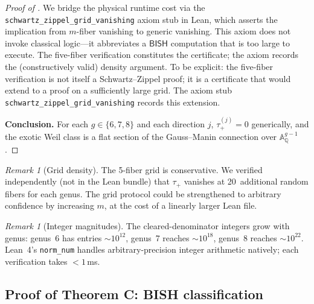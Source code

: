 \documentclass[11pt]{article}
\theoremstyle{plain}
\theoremstyle{definition}
\theoremstyle{remark}
\newtheorem{remark}[theorem]{Remark}
\newcommand{\QQ}{\mathbb{Q}}
\newcommand{\Aff}{\mathbb{A}}
\newcommand{\BISH}{\mathsf{BISH}}
\begin{document}
\begin{proof}[Proof of ]
We bridge the physical runtime cost via the
\texttt{schwartz\_zippel\_grid\_vanishing} axiom stub in Lean,
which asserts the implication from $m$-fiber vanishing to generic
vanishing.  This axiom does not invoke classical logic---it
abbreviates a $\BISH$ computation that is too large to execute.
The five-fiber verification constitutes the certificate; the axiom
records the (constructively valid) density argument.
To be explicit: the five-fiber verification is not itself a
Schwartz--Zippel proof; it is a certificate that would extend to a proof
on a sufficiently large grid.  The axiom stub
\texttt{schwartz\_zippel\_grid\_vanishing} records this extension.

\medskip\noindent\textbf{Conclusion.}
For each $g \in \{6,7,8\}$ and each direction $j$, $\tau_+^{(j)} = 0$
generically, and the exotic Weil class is a flat section of the
Gauss--Manin connection over $\Aff^{g-1}_\QQ$.
\end{proof}

\begin{remark}[Grid density]
The 5-fiber grid is conservative.  We verified independently (not in the
Lean bundle) that $\tau_+$ vanishes at 20~additional random fibers for
each genus.  The grid protocol could be strengthened to arbitrary confidence
by increasing $m$, at the cost of a linearly larger Lean file.
\end{remark}

\begin{remark}[Integer magnitudes]
The cleared-denominator integers grow with genus:
genus~6 has entries $\sim 10^{12}$,
genus~7 reaches $\sim 10^{18}$,
genus~8 reaches $\sim 10^{22}$.
Lean~4's \texttt{norm\_num} handles arbitrary-precision integer arithmetic
natively; each verification takes $<1$\,ms.
\end{remark}

\subsection{Proof of Theorem C: BISH classification}
\label{sec:proof-C}
\end{document}

